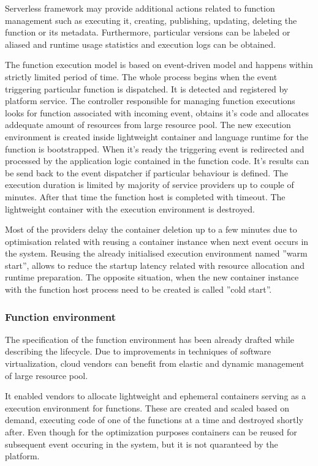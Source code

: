 Serverless framework may provide additional actions related to function management such as executing it, creating, publishing, updating, deleting the function or its metadata. Furthermore, particular versions can be labeled or aliased and runtime usage statistics and execution logs can be obtained.

The function execution model is based on event-driven model and happens within strictly limited period of time. 
The whole process begins when the event triggering particular function is dispatched. It is detected and registered by platform service.
The controller responsible for managing function executions looks for function associated with incoming event, obtains it's code and allocates addequate amount of resources from large resource pool. 
The new execution environment is created inside lightweight container and language runtime for the function is bootstrapped. 
When it's ready the triggering event is redirected and processed by the application logic contained in the function code. It's results can be send back to the event dispatcher if particular behaviour is defined.
The execution duration is limited by majority of service providers up to couple of minutes. After that time the function host is completed with timeout.
The lightweight container with the execution environment is destroyed. 

Most of the providers delay the container deletion up to a few minutes due to optimisation related with reusing a container instance when next event occurs in the system. Reusing the already initialised execution environment named ''warm start'', allows to reduce the startup latency related with resource allocation and runtime preparation. The opposite situation, when the new container instance with the function host process need to be created is called ''cold start''.

\subsubsection*{Function environment}

The specification of the function environment has been already drafted while describing the lifecycle. Due to improvements in techniques of software virtualization, cloud vendors can benefit from elastic and dynamic management of large resource pool. 

It enabled vendors to allocate lightweight and ephemeral containers serving as a execution environment for functions. These are created and scaled based on demand, executing code of one of the functions at a time and destroyed shortly after. Even though for the optimization purposes containers can be reused for subsequent event occuring in the system, but it is not quaranteed by the platform. 

